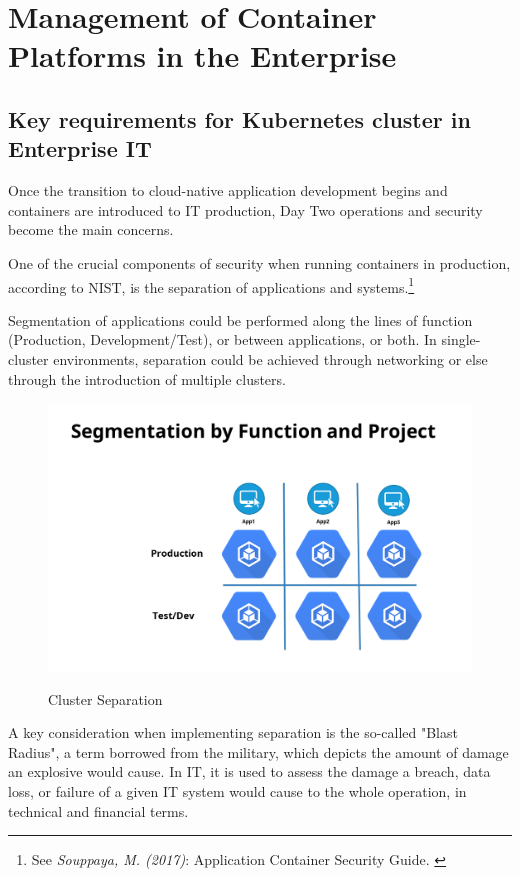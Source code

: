 %
%

\pagebreak
\section{Management of Container Platforms in the Enterprise}

\onehalfspacing

\subsection{Key requirements for Kubernetes cluster in Enterprise IT}

Once the transition to cloud-native application development begins and containers are introduced to IT production, Day Two operations and security become the main concerns.

One of the crucial components of security when running containers in production, according to NIST, is the separation of applications and systems.\footnote{See \textit{Souppaya, M. (2017)}: Application Container Security Guide. \cite{sp800-190}}

Segmentation of applications could be performed along the lines of function (Production, Development/Test), or between applications, or both. In single-cluster environments, separation could be achieved through networking or else through the introduction of multiple clusters. 

\begin{figure}[h]
\centering
\caption {Cluster Separation}
\includegraphics[width=\linewidth]{images/separation}
\label{fig:clusterSeparation}
\end{figure}

A key consideration when implementing separation is the so-called "Blast Radius", a term borrowed from the military, which depicts the amount of damage an explosive would cause. In IT, it is used to assess the damage a breach, data loss, or failure of a given IT system would cause to the whole operation, in technical and financial terms.

